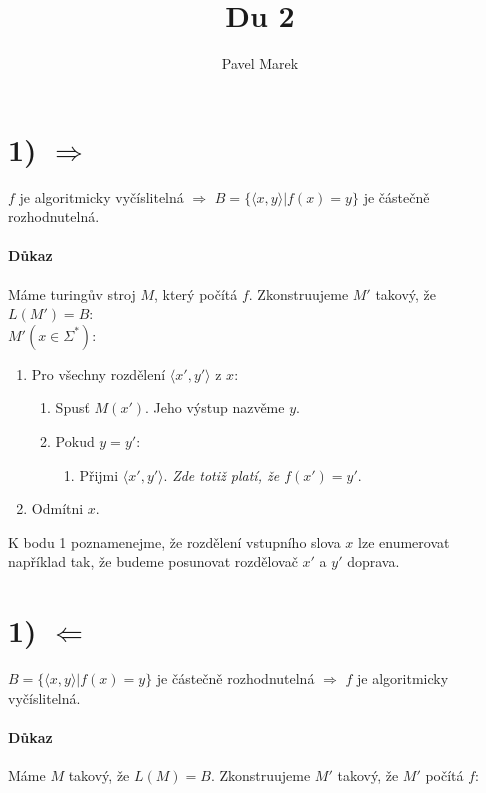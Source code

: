 \documentclass{article}
\begin{document}
\title{Du 2}
\author{Pavel Marek}
\date{}

\maketitle

\section*{1) $\Rightarrow$}
$f$ je algoritmicky vyčíslitelná $\Rightarrow$ 
$B = \{\langle x,y \rangle|f(x)=y\}$ je
částečně rozhodnutelná.

\paragraph{Důkaz}
Máme turingův stroj $M$, který počítá $f$. Zkonstruujeme $M'$ takový, že
$L(M')=B$: \\

$M'(x \in \Sigma^*)$:
\begin{enumerate}
  \item Pro všechny rozdělení $\langle x', y' \rangle$ z $x$:
  \begin{enumerate}
    \item Spusť $M(x')$. Jeho výstup nazvěme $y$.
    \item Pokud $y = y'$:
    \begin{enumerate}
      \item Přijmi $\langle x', y' \rangle$. \emph{Zde totiž platí, že $f(x') = y'$}.
    \end{enumerate}
  \end{enumerate}
  \item Odmítni $x$.
\end{enumerate}

K bodu 1 poznamenejme, že rozdělení vstupního slova $x$ lze enumerovat například
tak, že budeme posunovat rozdělovač $x'$ a $y'$ doprava.



\section*{1) $\Leftarrow$}
$B=\{\langle x,y \rangle|f(x)=y\}$ je částečně rozhodnutelná $\Rightarrow$ $f$
je algoritmicky vyčíslitelná.

\paragraph{Důkaz}
Máme $M$ takový, že $L(M) = B$. Zkonstruujeme $M'$ takový, že $M'$ počítá $f$:\\
\end{document}
